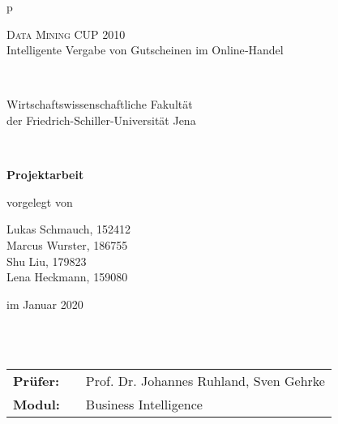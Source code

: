 \begin{center}
\begin{tabular}{p{\textwidth}}






\begin{center}
\LARGE{\textsc{
Data Mining CUP 2010
}} \\
Intelligente Vergabe von Gutscheinen im Online‐Handel
\end{center}

\\


\begin{center}
\large{Wirtschaftswissenschaftliche Fakultät \\
der Friedrich-Schiller-Universität Jena \\}
\end{center}

\\

\begin{center}
\textbf{\Large{Projektarbeit}}
\end{center}




\begin{center}
vorgelegt von
\end{center}

\begin{center}
Lukas Schmauch, 152412 \\
Marcus Wurster, 186755 \\
Shu Liu, 179823 \\
Lena Heckmann, 159080 \\
\end{center}

\begin{center}
\large{im Januar 2020}
\end{center}

\\

\\



\begin{center}
\begin{tabular}{lll}
\textbf{Prüfer:} & & Prof. Dr. Johannes Ruhland, Sven Gehrke\\
\textbf{Modul:} & & Business Intelligence\\
\end{tabular}
\end{center}

\end{tabular}
\end{center}